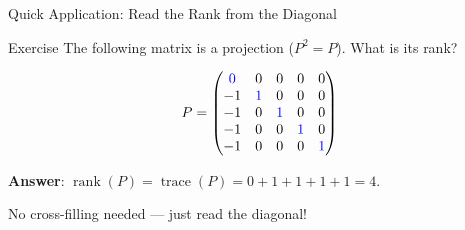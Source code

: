 \documentclass[10pt]{beamer}
\theoremstyle{definition}
\newcommand{\x}[1]{\alert{\textbf{#1}}}
\newcommand{\bl}[1]{{\color{blue}#1}}                 %
\begin{document}
\begin{frame}{Quick Application: Read the Rank from the Diagonal}

\begin{exampleblock}{Exercise}
The following matrix is a projection ($P^2 = P$). What is its rank?

$$P = \begin{pmatrix} \bl{0} & 0 & 0 & 0 & 0 \\ -1 & \bl{1} & 0 & 0 & 0 \\ -1 & 0 & \bl{1} & 0 & 0 \\ -1 & 0 & 0 & \bl{1} & 0 \\ -1 & 0 & 0 & 0 & \bl{1} \end{pmatrix}$$
\end{exampleblock}

\vspace{0.5em}

\x{Answer}: $\operatorname{rank}(P) = \operatorname{trace}(P) = 0 + 1 + 1 + 1 + 1 = 4$.

\vspace{0.5em}

No cross-filling needed --- just read the diagonal!

\end{frame}

%
%
\end{document}
